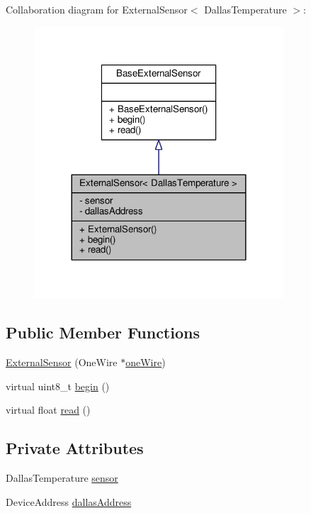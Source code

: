 Collaboration diagram for External\+Sensor$<$ Dallas\+Temperature $>$\+:\nopagebreak
\begin{figure}[H]
\begin{center}
\leavevmode
\includegraphics[width=264pt]{d0/d86/class_external_sensor_3_01_dallas_temperature_01_4__coll__graph}
\end{center}
\end{figure}
\subsection*{Public Member Functions}
\begin{DoxyCompactItemize}
\item 
\hyperlink{class_external_sensor_3_01_dallas_temperature_01_4_a5de0c37120d2d927bd0f37ff4a215baf}{External\+Sensor} (One\+Wire $\ast$\hyperlink{_external_sensors_8cpp_af39fa3dad1ba161b384c0b26b8145e65}{one\+Wire})
\item 
virtual uint8\+\_\+t \hyperlink{class_external_sensor_3_01_dallas_temperature_01_4_ac5275129b05e2ff8df45d5b222a661d9}{begin} ()
\item 
virtual float \hyperlink{class_external_sensor_3_01_dallas_temperature_01_4_a1e725d9338314515d4e5dc456ed6a6c8}{read} ()
\end{DoxyCompactItemize}
\subsection*{Private Attributes}
\begin{DoxyCompactItemize}
\item 
Dallas\+Temperature \hyperlink{class_external_sensor_3_01_dallas_temperature_01_4_adb6ba4fcdedef95ad8f6b0c9b6c0f9d1}{sensor}
\item 
Device\+Address \hyperlink{class_external_sensor_3_01_dallas_temperature_01_4_a7d9e9d2893e453638fcf440e5d8d9082}{dallas\+Address}
\end{DoxyCompactItemize}


